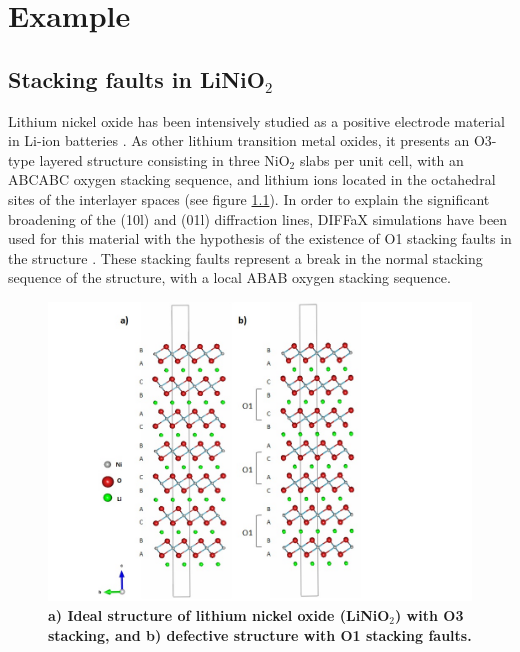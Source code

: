 \chapter{Example}
\label{example}
\setcounter{page}{32}






\section{Stacking faults in LiNiO$_{2}$}

Lithium nickel oxide has been intensively studied as a positive electrode material in Li-ion batteries \cite{Whit2004}.
As other lithium transition metal oxides, it presents an O3-type layered structure consisting in three NiO$_{2}$ slabs per unit cell, with an ABCABC oxygen stacking sequence, and lithium ions located in the octahedral sites of the interlayer spaces (see figure \ref{estructura}). In order to explain the significant broadening of the (10l) and (01l) diffraction lines, DIFFaX simulations have been used for this material with the hypothesis of the existence of O1 stacking faults in the structure \cite{Crog2000}. These stacking faults represent a break in the normal stacking sequence of the structure, with a local ABAB oxygen stacking sequence.

\begin{figure}[t]
\begin{center}
\includegraphics [width=5.5 in]{LiNO_estructura.jpg}
\caption{\bf a) Ideal structure of lithium nickel oxide (LiNiO$_{2}$) with O3 stacking, and b) defective structure with O1 stacking faults.}
\label{estructura}
\end{center}
\end{figure}

